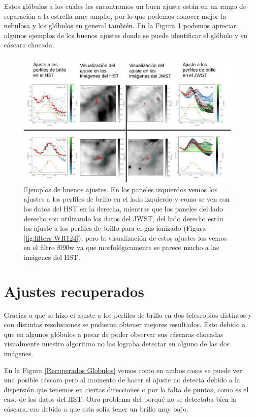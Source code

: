 \documentclass{book}
\begin{document}
Estos glóbulos a los cuales les encontramos un buen ajuste están en un
rango de separación a la estrella muy amplio, por lo que podemos
conocer mejor la nebulosa y los glóbulos en general también. En la
Figura \ref{Goog G} podemos apreciar algunos ejemplos de los buenos
ajustes donde se puede identificar el glóbulo y su cáscara chocada.

\begin{figure}[htb]
    \centering
    \includegraphics[width=\textwidth]{imagenes_corregidas/buenos_aj.pdf}
    \caption{Ejemplos de buenos ajustes. En los paneles izquierdos
      vemos los ajustes a los perfiles de brillo en el lado izquierdo
      y como se ven con los datos del HST en la derecha, mientras que
      los paneles del lado derecho son utilizando los datos del JWST,
      del lado derecho están los ajuste a los perfiles de brillo para
      el gas ionizado (Figura \ref{fig:filters WR124}), pero la
      visualización de estos ajustes los vemos en el filtro f090w ya
      que morfológicamente se parece mucho a las imágenes del HST.}
    \label{Goog G}
\end{figure}

\section{Ajustes recuperados}

Gracias a que se hizo el ajuste a los perfiles de brillo en dos
telescopios distintos y con distintas resoluciones se pudieron obtener
mejores resultados. Esto debido a que en algunos glóbulos a pesar de
poder observar sus cáscaras chocadas visualmente nuestro algoritmo no
las lograba detectar en alguno de las dos imágenes.

En la Figura \ref{Recuperados Globulos} vemos como en ambos casos se
puede ver una posible cáscara pero al momento de hacer el ajuste no
detecta debido a la dispersión que tenemos en ciertas direcciones o
por la falta de puntos, como es el caso de los datos del HST. Otro
problema del porqué no se detectaba bien la cáscara, era debido a que
esta solía tener un brillo muy bajo.
\end{document}
